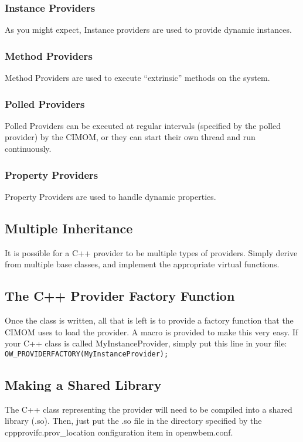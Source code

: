 \documentclass[letterpaper,10pt]{article}
\begin{document}
\subsubsection{Instance Providers}
As you might expect, Instance providers are used to provide dynamic 
instances.  
\subsubsection{Method Providers}
Method Providers are used to execute ``extrinsic'' methods on the system.
\subsubsection{Polled Providers}
Polled Providers can be executed at regular intervals (specified by 
the polled provider) by the CIMOM, or they can start their own thread 
and run continuously. 
\subsubsection{Property Providers}
Property Providers are used to handle dynamic properties. 
\subsection{Multiple Inheritance}
It is possible for a C++ provider to be multiple types of providers.  
Simply derive from multiple base classes, and implement the appropriate
virtual functions.  
\subsection{The C++ Provider Factory Function}
Once the class is written, all that is left is to provide a factory 
function that the CIMOM uses to load the provider.  A macro is provided
to make this very easy.  If your C++ class is called 
\mbox{MyInstanceProvider}, simply put this line in your file:\\
\mbox{\texttt{OW\_PROVIDERFACTORY(MyInstanceProvider);}}
\subsection{Making a Shared Library}
The C++ class representing the provider will need to be compiled into 
a shared library (.so).  Then, just put the .so file in the directory
specified by the \mbox{cppprovifc.prov\_location} configuration item
in openwbem.conf.
\end{document}
